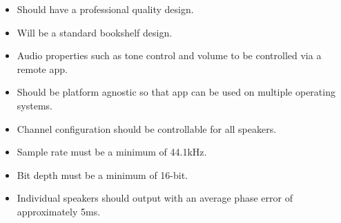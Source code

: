\documentclass[main.tex]{subfiles}
\begin{document}
\begin{itemize}
    \item Should have a professional quality design.
    \item Will be a standard bookshelf design.
    \item Audio properties such as tone control and volume to be controlled via a remote app.
    \item Should be platform agnostic so that app can be used on multiple operating systems.
    \item Channel configuration should be controllable for all speakers.
    \item Sample rate must be a minimum of 44.1kHz.
    \item Bit depth must be a minimum of 16-bit.
    \item Individual speakers should output with an average phase error of approximately 5ms.
\end{itemize}
\end{document}
